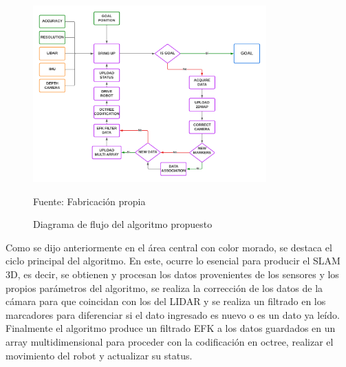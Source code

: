 \begin{figure}[h]
    \centering
    \includegraphics[width=0.8\textwidth]{figures/03propuesta_solucion/slam_3d_proposal.png}
    \caption{\label{fig:slam_3d_proposal_flujo} Diagrama de flujo del algoritmo propuesto} 
    Fuente: Fabricación propia
\end{figure}

Como se dijo anteriormente en el área central con color morado, se destaca el ciclo principal del algoritmo. En este, ocurre lo esencial para producir el SLAM 3D, es decir, se obtienen y procesan los datos provenientes de los sensores y los propios parámetros del algoritmo, se realiza la corrección de los datos de la cámara para que coincidan con los del LIDAR y se realiza un filtrado en los marcadores para diferenciar si el dato ingresado es nuevo o es un dato ya leído. Finalmente el algoritmo produce un filtrado EFK a los datos guardados en un array multidimensional para proceder con la codificación en octree, realizar el movimiento del robot y actualizar su status.

